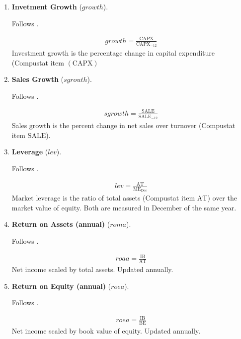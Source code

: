 \begin{enumerate}
	
	
	\item \textbf{Invetment Growth} ($growth$). 
	
	Follows . 
	
	\begin{align*}
		growth = \frac{ \mathrm{CAPX} }{ \mathrm{CAPX}_{-12} }
	\end{align*}
	Investment growth is the percentage change in capital expenditure (Compustat item $(\mathrm{CAPX})$
	
	
	
	\item \textbf{Sales Growth} ($sgrouth$).
	
	Follows .
	
	\begin{align*}
		sgrowth = \frac{ \mathrm{SALE} }{ \mathrm{SALE}_{-12} }
	\end{align*}
	Sales growth is the percent change in net sales over turnover (Compustat item $\mathrm{SALE}$).
	
	
	
	\item \textbf{Leverage} ($lev$). 
	
	Follows . 
	
	\begin{align*}
		lev = \frac{ \mathrm{AT} }{ \mathrm{ME}_{\text{Dec}} }
	\end{align*}
	Market leverage is the ratio of total assets (Compustat item $\mathrm{AT}$) over the market value of equity. Both are measured in December of the same year.
	
	
	
	\item \textbf{Return on Assets (annual)} ($roma$).
	
	Follows . 
	
	\begin{align*}
		roaa = \frac{ \mathrm{IB} }{ \mathrm{AT} }
	\end{align*}
	Net income scaled by total assets. Updated annually.
	
	
	
	\item \textbf{Return on Equity (annual)} ($roea$). 
	
	Follows . 
	
	\begin{align*}
		roea = \frac{ \mathrm{IB} }{ \mathrm{BE} }
	\end{align*}
	Net income scaled by book value of equity. Updated annually.
	

\end{enumerate}
